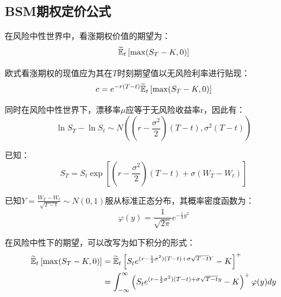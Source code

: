 \documentclass[11pt]{article}
\begin{document}
\subsection{BSM期权定价公式}

在风险中性世界中，看涨期权价值的期望为：
\begin{equation*}
    \widetilde{\mathbb{E}}_t \left[ \max(S_T-K,0) \right]
\end{equation*}

欧式看涨期权的现值应为其在$T$时刻期望值以无风险利率进行贴现：
\begin{equation*}
    c = e^{-r(T-t)} \widetilde{\mathbb{E}}_t \left[ \max(S_T-K,0) \right]
\end{equation*}

同时在风险中性世界下，漂移率$\mu$应等于无风险收益率r，因此有：
\begin{equation*}
    \ln S_T - \ln S_t \sim N \left((r-\frac{\sigma^2}{2})(T-t), \sigma^2(T-t)\right)
\end{equation*}

已知：
\begin{equation*}
    S_T = S_t \exp\left[\left(r-\frac{\sigma^2}{2}\right)\left(T-t\right) + \sigma\left(W_T - W_t \right)\right]
\end{equation*}

已知$Y = \frac{W_T - W_t}{\sqrt{T-t}} \sim N(0,1)$服从标准正态分布，其概率密度函数为：
\begin{equation*}
    \varphi(y) = \frac{1}{\sqrt{2\pi}} e^{-\frac{1}{2}y^2}
\end{equation*}

在风险中性下的期望，可以改写为如下积分的形式：
\begin{align*}
    \widetilde{\mathbb{E}}_t \left[ \max(S_T-K,0) \right] & = \widetilde{\mathbb{E}}_t \left[ S_t e^{(r-\frac{1}{2}\sigma^2)(T-t) + \sigma\sqrt{T-t}Y} - K \right]^+ \\
    & = \int_{-\infty}^{\infty} \left( S_t e^{(r-\frac{1}{2}\sigma^2)(T-t) + \sigma\sqrt{T-t}y} - K \right)^+ \varphi(y) dy
\end{align*}
\end{document}
